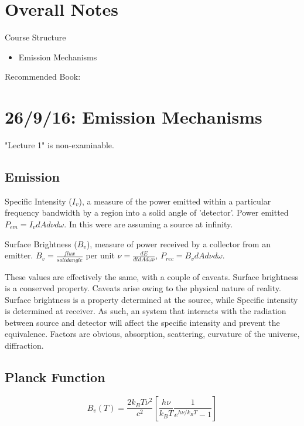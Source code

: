 \documentclass[]{article}
\begin{document}
\large

\section*{Overall Notes}

Course Structure
\begin{itemize}
	\item Emission Mechanisms
\end{itemize}

Recommended Book:

\section{26/9/16: Emission Mechanisms}

"Lecture 1" is non-examinable.

\subsection{Emission}

Specific Intensity ($I_v$), a measure of the power emitted within a particular frequency bandwidth by a region into a solid angle of 'detector'. Power emitted $P_{em} = I_vdAd\nu d\omega$. In this were are assuming a source at infinity.

Surface Brightness ($B_v$), measure of power received by a collector from an emitter. $B_v = \frac{flux}{solid angle}$ per unit $\nu = \frac{dE}{dtdAd\omega\nu}$, $P_{rec} = B_vdAd\nu d\omega$.

These values are effectively the same, with a couple of caveats. Surface brightness is a conserved property. Caveats arise owing to the physical nature of reality. Surface brightness is a property determined at the source, while Specific intensity is determined at receiver. As such, an system that interacts with the radiation between source and detector will affect the specific intensity and prevent the equivalence. Factors are obvious, absorption, scattering, curvature of the universe, diffraction.

\subsection{Planck Function}

\begin{equation}
B_v(T) = \frac{2k_BT\nu^2}{c^2}[\frac{h\nu}{k_BT}\frac{1}{e^{h\nu/k_BT}-1}]
\end{equation}
\end{document}
